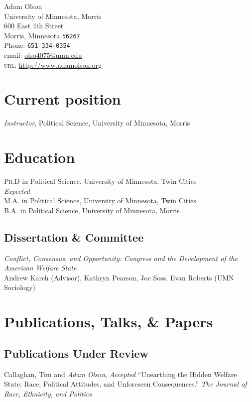 \documentclass[12pt, letter]{article}
\newcommand{\years}[1]{\marginnote{\normalsize #1}}
\begin{document}
{\LARGE Adam Olson}\\[1cm]
University of Minnesota, Morris\\
600 East 4th Street \\
Morris, Minnesota \texttt{56267} \\[.2cm]
Phone: \texttt{651-334-0354}\\
email: \href{mailto:olso4075@umn.edu}{olso4075@umn.edu}\\
\textsc{url}: \href{http://www.adamolson.org}{http://www.adamolson.org} 

\section*{Current position}
\emph{Instructor}, Political Science, University of Minnesota, Morris

\section*{Education}
\noindent
\years{2017}\textsc{Ph.D} in Political Science, University of Minnesota, Twin Cities\\
\textit{Expected}\\
\years{2014}\textsc{M.A.} in Political Science, University of Minnesota, Twin Cities\\
\years{2010}\textsc{B.A.} in Political Science, University of Minnesota, Morris

\subsection*{Dissertation \& Committee}
\emph{Conflict, Consensus, and Opportunity: Congress and the Development of the American Welfare State} \\
Andrew Karch (Advisor), Kathryn Pearson, Joe Soss, Evan Roberts (UMN Sociology)

\section*{Publications, Talks, \& Papers}
\subsection*{Publications Under Review}
\noindent
Callaghan, Tim and \emph{Adam Olson}, \textit{ Accepted} ``Unearthing the Hidden Welfare State: Race, Political Attitudes, and Unforeseen Consequences.'' \textit{The Journal of Race, Ethnicity, and Politics}
\end{document}
